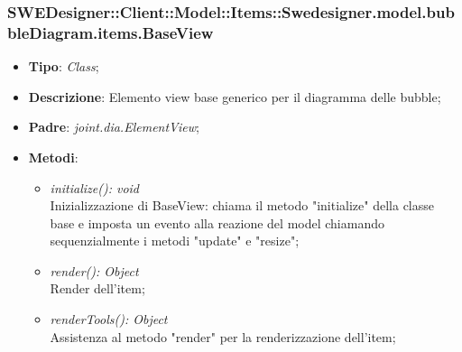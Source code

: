 \documentclass[../DefinizioneDiProdotto.tex]{subfiles}
\begin{document}
			\subsubsection{SWEDesigner::Client::Model::Items::Swedesigner.model.bubbleDiagram.items.BaseView}
			\hypertarget{SWEDesigner::Client::Model::Items::Swedesigner.model.bubbleDiagram.items.BaseView}{}
			\begin{itemize}
				\item \textbf{Tipo}: \emph{Class};
				\item \textbf{Descrizione}: Elemento view base generico per il diagramma delle bubble;
				\item \textbf{Padre}: \emph{joint.dia.ElementView};
				\item \textbf{Metodi}:
				\begin{itemize}
					\item \emph{initialize(): void}\\
					Inizializzazione di BaseView: chiama il metodo "initialize" della classe base e imposta un evento alla reazione del model chiamando sequenzialmente i metodi "update" e "resize";
					\item \emph{render(): Object}\\
					Render dell'item;
					\item \emph{renderTools(): Object}\\
					Assistenza al metodo "render" per la renderizzazione dell'item;
				\end{itemize}
			\end{itemize}
			
\end{document}
